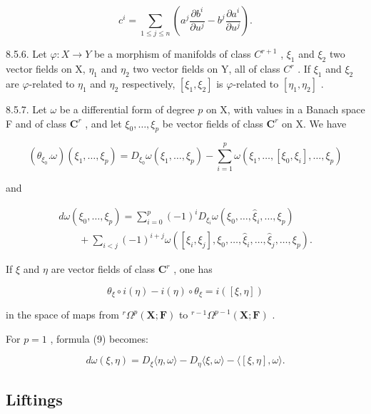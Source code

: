 \[
c ^ {i} = \sum_ {1 \leqslant j \leqslant n} \left(a ^ {j} \frac {\partial b ^ {i}}{\partial u ^ {j}} - b ^ {j} \frac {\partial a ^ {i}}{\partial u ^ {j}}\right).\tag{7}
\]

8.5.6. Let \(\varphi: X \to Y\) be a morphism of manifolds of class \(C^{r+1}\) , \(\xi_1\) and \(\xi_2\) two vector fields on X, \(\eta_{1}\) and \(\eta_{2}\) two vector fields on Y, all of class \(C^r\) . If \(\xi_{1}\) and \(\xi_{2}\) are \(\varphi\)-related to \(\eta_{1}\) and \(\eta_{2}\) respectively, \([\xi_{1}, \xi_{2}]\) is \(\varphi\)-related to \([\eta_{1}, \eta_{2}]\) .

8.5.7. Let \(\omega\) be a differential form of degree \(p\) on X, with values in a Banach space F and of class \(\mathbf{C}^r\) , and let \(\xi_0, \ldots, \xi_p\) be vector fields of class \(\mathbf{C}^r\) on X. We have

\[
(\theta_ {\xi_ {0}}. \omega) (\xi_ {1}, \dots , \xi_ {p}) = D _ {\xi_ {0}} \omega (\xi_ {1}, \dots , \xi_ {p}) - \sum_ {i = 1} ^ {p} \omega (\xi_ {1}, \dots , [ \xi_ {0}, \xi_ {i} ], \dots , \xi_ {p})\tag{8}
\]

and

\[
\begin{array}{l} d \omega (\xi_ {0}, \dots , \xi_ {p}) = \sum_ {i = 0} ^ {p} (- 1) ^ {i} D _ {\xi_ {i}} \omega (\xi_ {0}, \dots , \hat {\xi} _ {i}, \dots , \xi_ {p}) \\ \qquad + \sum_ {i <   j} (- 1) ^ {i + j} \omega ([ \xi_ {i}, \xi_ {j} ], \xi_ {0}, \dots , \hat {\xi} _ {i}, \dots , \hat {\xi} _ {j}, \dots , \xi_ {p}). \end{array}\tag{9}
\]

If \(\xi\) and \(\eta\) are vector fields of class \(\mathbf{C}^r\) , one has

\[
\theta_ {\xi} \circ i (\eta) - i (\eta) \circ \theta_ {\xi} = i ([ \xi , \eta ])\tag{10}
\]

in the space of maps from \(^{r}\Omega^{p}(\mathbf{X};\mathbf{F})\) to \(^{r-1}\Omega^{p-1}(\mathbf{X};\mathbf{F})\) .

For \(p = 1\) , formula (9) becomes:

\[
d \omega (\xi , \eta) = D _ {\xi} \langle \eta , \omega \rangle - D _ {\eta} \langle \xi , \omega \rangle - \langle [ \xi , \eta ], \omega \rangle .\tag{11}
\]

\subsection{Liftings}

